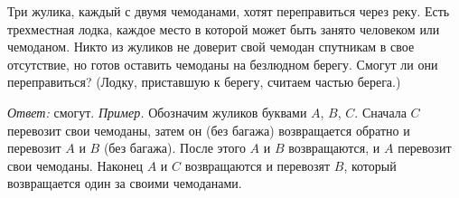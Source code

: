 \problem
{}
Три жулика, каждый с двумя чемоданами, хотят переправиться через реку.
Есть трехместная лодка, каждое место в которой может быть занято человеком или
чемоданом.
Никто из жуликов не доверит свой чемодан спутникам в свое отсутствие, но готов
оставить чемоданы на безлюдном берегу.
Смогут ли они переправиться?
(Лодку, приставшую к берегу, считаем частью берега.)

\solution
\emph{Ответ:} смогут.
\emph{Пример.}
Обозначим жуликов буквами $A$, $B$, $C$.
Сначала $C$ перевозит свои чемоданы, затем он (без багажа) возвращается обратно
и перевозит $A$ и $B$ (без багажа).
После этого $A$ и $B$ возвращаются, и $A$ перевозит свои чемоданы.
Наконец $A$ и $C$ возвращаются и перевозят $B$, который возвращается один за
своими чемоданами.

\endproblem
